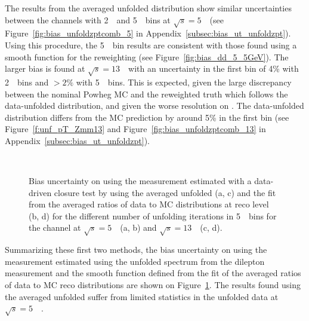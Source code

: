 The results from the averaged unfolded \ptz distribution show similar uncertainties between the channels with 2~\GeV\ and 5~\GeV\ bins at $\sqrt{s} = 5$~\TeV\ (see Figure~\ref{fig:bias_unfoldzptcomb_5} in Appendix~\ref{subsec:bias_ut_unfoldzpt}). Using this procedure, the 5~\GeV\ bin results are consistent with those found using a smooth function for the reweighting (see Figure~\ref{fig:bias_dd_5_5GeV}).
The larger bias is found at $\sqrt{s} = 13$~\TeV\ with an uncertainty in the first bin of 4\% with 2~\GeV\ bins and $>2\%$ with 5~\GeV\ bins. This is expected, given the large discrepancy between the nominal Powheg MC and the reweighted truth which follows the data-unfolded distribution, and given the worse resolution on \ut. The data-unfolded distribution differs from the MC prediction by around 5\% in the first bin (see Figure~\ref{f:unf_pT_Zmm13} and Figure~\ref{fig:bias_unfoldzptcomb_13} in Appendix~\ref{subsec:bias_ut_unfoldzpt}).

\begin{figure}[h]
\centering
{}
\\
\caption{Bias uncertainty on \ptz using the \ut measurement estimated with a data-driven closure test by using the averaged unfolded \ptz (a, c) and the fit from the averaged ratios of data to MC distributions at reco level (b, d) for the different number of unfolding iterations in 5~\GeV\ bins for the \Zmm channel at $\sqrt{s} = 5$~\TeV\ (a, b) and $\sqrt{s} = 13$~\TeV\ (c, d).}
\label{fig:bias_checks_13_5GeV}
\end{figure}

Summarizing these first two methods, the bias uncertainty on \ptz using the \ut measurement estimated using the unfolded \ptz spectrum from the dilepton \pt measurement and the smooth function defined from the fit of the averaged ratios of data to MC reco distributions are shown on Figure~\ref{fig:bias_checks_13_5GeV}. The results found using the averaged unfolded \ptz suffer from limited statistics in the unfolded \ptz data at $\sqrt{s} = 5$~\TeV\ .

